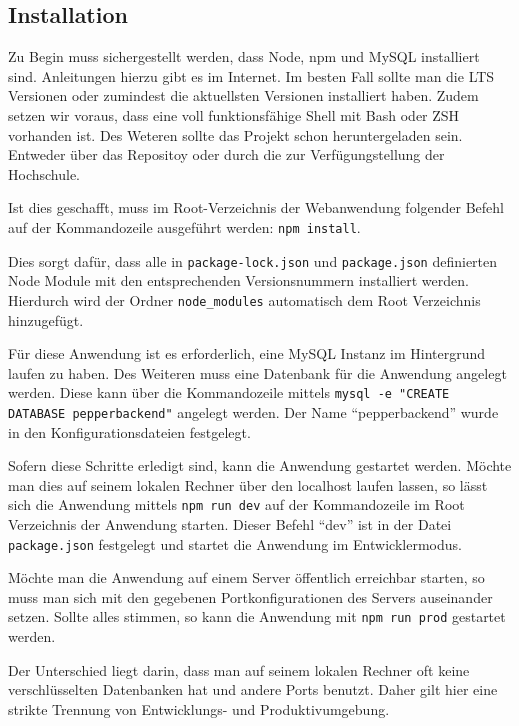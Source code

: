 \subsection*{Installation}
\label{sec:nodechapter-installation}
Zu Begin muss sichergestellt werden, dass Node, npm und MySQL installiert sind. Anleitungen hierzu gibt es im Internet. Im besten Fall sollte man die LTS Versionen oder zumindest die aktuellsten Versionen installiert haben. Zudem setzen wir voraus, dass eine voll funktionsfähige Shell mit Bash oder ZSH vorhanden ist. Des Weteren sollte das Projekt schon heruntergeladen sein. Entweder über das Repositoy oder durch die zur Verfügungstellung der Hochschule.

Ist dies geschafft, muss im Root-Verzeichnis der Webanwendung folgender Befehl auf der Kommandozeile ausgeführt werden: \verb|npm install|.

Dies sorgt dafür, dass alle in \verb|package-lock.json| und \verb|package.json| definierten Node Module mit den entsprechenden Versionsnummern installiert werden. Hierdurch wird der Ordner \verb|node_modules| automatisch dem Root Verzeichnis hinzugefügt.

Für diese Anwendung ist es erforderlich, eine MySQL Instanz im Hintergrund laufen zu haben. Des Weiteren muss eine Datenbank für die Anwendung angelegt werden. Diese kann über die Kommandozeile mittels \verb|mysql -e "CREATE DATABASE pepperbackend"| angelegt werden. Der Name ``pepperbackend'' wurde in den Konfigurationsdateien festgelegt.

Sofern diese Schritte erledigt sind, kann die Anwendung gestartet werden. Möchte man dies auf seinem lokalen Rechner über den localhost laufen lassen, so lässt sich die Anwendung mittels \verb|npm run dev| auf der Kommandozeile im Root Verzeichnis der Anwendung starten. Dieser Befehl ``dev'' ist in der Datei \verb|package.json| festgelegt und startet die Anwendung im Entwicklermodus.

Möchte man die Anwendung auf einem Server öffentlich erreichbar starten, so muss man sich mit den gegebenen Portkonfigurationen des Servers auseinander setzen. Sollte alles stimmen, so kann die Anwendung mit \verb|npm run prod| gestartet werden.

Der Unterschied liegt darin, dass man auf seinem lokalen Rechner oft keine verschlüsselten Datenbanken hat und andere Ports benutzt. Daher gilt hier eine strikte Trennung von Entwicklungs- und Produktivumgebung.

